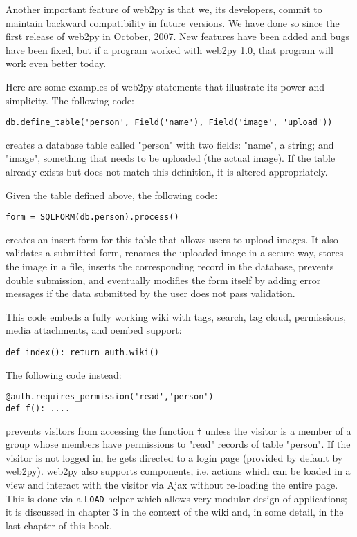 \documentclass[justified,sixbynine,notoc]{tufte-book}
\def\ft{\small\tt}
\begin{document}
\begin{fullwidth}
Another important feature of web2py is that we, its developers, commit to maintain backward compatibility in future versions. We have done so since the first release of web2py in October, 2007.
New features have been added and bugs have been fixed, but if a program worked with web2py 1.0, that program will work even better today.

Here are some examples of web2py statements that illustrate its power and simplicity. The following code:
\begin{lstlisting}
db.define_table('person', Field('name'), Field('image', 'upload'))
\end{lstlisting}
\noindent creates a database table called "person" with two fields: "name", a string; and "image", something that
needs to be uploaded (the actual image). If the table already exists but does not match this definition, it is altered appropriately.

Given the table defined above, the following code:
\begin{lstlisting}
form = SQLFORM(db.person).process()
\end{lstlisting}
\noindent creates an insert form for this table that allows users to upload images. It also
validates a submitted form, renames the uploaded image in a secure way, stores the image in a file,
inserts the corresponding record in the database, prevents double submission, and eventually modifies
the form itself by adding error messages if the data submitted by the user does not pass validation.

This code embeds a fully working wiki with tags, search, tag cloud, permissions, media attachments, and oembed support:

\begin{lstlisting}
def index(): return auth.wiki()
\end{lstlisting}

The following code instead:
\begin{lstlisting}
@auth.requires_permission('read','person')
def f(): ....
\end{lstlisting}
\noindent prevents visitors from accessing the function {\ft f} unless the visitor is a member of a group whose members have permissions to "read" records of table "person". If the visitor is not logged in, he gets directed to a login page (provided by default by web2py).
\noindent web2py also supports components, i.e. actions which can be loaded in a view and interact with the visitor via Ajax without re-loading the entire page. This is done via a {\ft LOAD} helper which allows very modular design of applications; it is discussed in chapter 3 in the context of the wiki and, in some detail, in the last chapter of this book.


\end{fullwidth}
\end{document}
